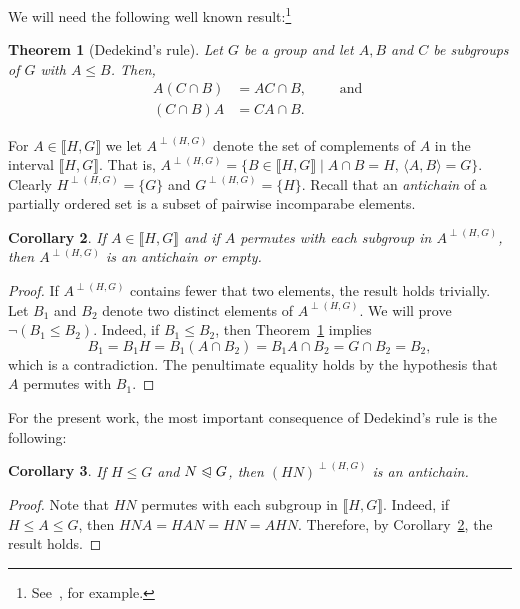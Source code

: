 \documentclass{gen-j-l}
\newcommand{\lb}{\ensuremath{\llbracket}}
\newcommand{\rb}{\ensuremath{\rrbracket}}
\newcommand{\<}{\ensuremath{\langle}}
\renewcommand{\>}{\ensuremath{\rangle}}
\theoremstyle{plain}
\newtheorem{theorem}{Theorem}[section]
\newtheorem{corollary}[theorem]{Corollary}
\theoremstyle{definition}
\theoremstyle{remark}
\numberwithin{theorem}{section}
\numberwithin{claim}{section}
\numberwithin{equation}{section}
\numberwithin{conjecture}{section}
\renewcommand{\leq}{\ensuremath{\leqslant}}
\newcommand{\subnormal}{\ensuremath{\trianglelefteqslant}}
\newcommand{\2}{\ensuremath{\mathbf{2}}}
\newcommand{\3}{\ensuremath{\mathbf{3}}}
\begin{document}
We will need the following well known result:\footnote{See~\cite[p.~122]{Rose:1978}, for example.}  
\begin{theorem}[Dedekind's rule]
  \label{lemma-dedekind}
Let $G$ be a group and let $A, B$ and $C$ be subgroups of $G$ with $A\leq B$.  Then,
\begin{align}
\label{eq:dedekind1}
A(C\cap B) &= AC \cap B,\qquad \text{ and }\\
\label{eq:dedekind2}
(C\cap B)A &= CA \cap B.
\end{align}
\end{theorem}

For $A \in \lb H, G \rb$ we let $A^{\perp(H,G)}$ denote the set of
complements of $A$ in the interval $\lb H, G\rb$.  That is,
$A^{\perp(H,G)} = \{B \in \lb H, G \rb \mid A \cap B = H, \, \<A, B\> = G\}.$
Clearly $H^{\perp(H,G)} = \{G\}$ and $G^{\perp(H,G)} = \{H\}$.
Recall that an \emph{antichain} of a partially ordered set is a subset of
pairwise incomparabe elements.

\begin{corollary}
\label{cor:dedekind1}
If $A \in \lb H, G\rb$ and if $A$ permutes with each subgroup in
$A^{\perp(H,G)}$, then $A^{\perp(H,G)}$ is an antichain or empty.
\end{corollary}
\begin{proof}
If $A^{\perp(H,G)}$ contains fewer that two elements, the result holds
trivially. Let $B_1$ and $B_2$ denote two distinct elements of $A^{\perp(H,G)}$.
We will prove $\neg (B_1 \leq B_2)$.  Indeed, if $B_1 \leq B_2$, then 
Theorem~\ref{lemma-dedekind} implies
\[
B_1 = B_1H = B_1(A \cap B_2) = B_1A \cap B_2 = G \cap B_2 = B_2,
\]
which is a contradiction.  The penultimate equality holds by the hypothesis that
$A$ permutes with $B_1$. 
\end{proof}

For the present work, the most important consequence of Dedekind's rule is the
following: 
\begin{corollary}
\label{cor:dedekind2}
If $H\leq G$ and $N\subnormal G$, then $(HN)^{\perp(H,G)}$ is an
antichain. 
\end{corollary}
\begin{proof}
Note that $HN$ permutes with each
subgroup in $\lb H, G\rb$.  Indeed, if $H \leq A \leq G$, then 
$HNA = HAN = HN = AHN$. Therefore, by Corollary~\ref{cor:dedekind1}, the result holds. 
\end{proof}
\end{document}
